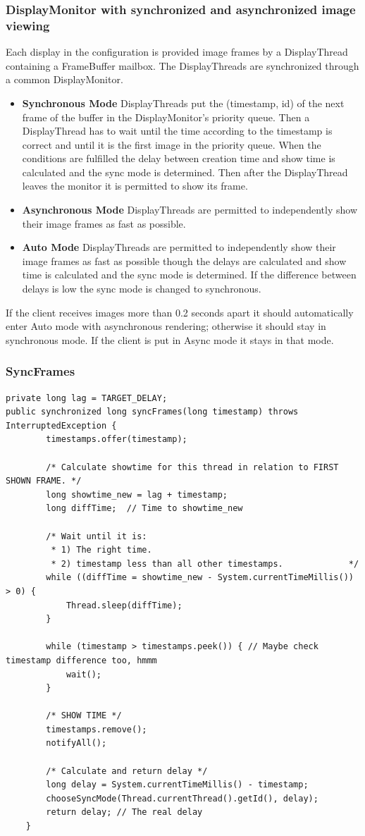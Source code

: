 \documentclass[8pt,titlepage]{article}
\begin{document}
\subsubsection{DisplayMonitor with synchronized and asynchronized image viewing}
Each display in the configuration is provided image frames by a DisplayThread containing a FrameBuffer mailbox. The DisplayThreads are synchronized through a common DisplayMonitor.

\begin{itemize}
\item \textbf{Synchronous Mode} DisplayThreads put the (timestamp, id) of the next frame of the buffer in the DisplayMonitor’s priority queue. Then a DisplayThread has to wait until the time according to the timestamp is correct and until it is the first image in the priority queue. When the conditions are fulfilled the delay between creation time and show time is calculated and the sync mode is determined. Then after the DisplayThread leaves the monitor it is permitted to show its frame. 	
\item \textbf{Asynchronous Mode} DisplayThreads are permitted to independently show their image frames as fast as possible.
\item \textbf{Auto Mode} DisplayThreads are permitted to independently show their image frames as fast as possible though the delays are calculated and show time is calculated and the sync mode is determined. If the difference between delays is low the sync mode is changed to synchronous.
\end{itemize}

If the client receives images more than 0.2 seconds apart it should automatically enter Auto mode with asynchronous rendering; otherwise it should stay in synchronous mode. If the client is put in Async mode it stays in that mode.

\subsubsection{SyncFrames}
\begin{verbatim}
private long lag = TARGET_DELAY;
public synchronized long syncFrames(long timestamp) throws InterruptedException {
		timestamps.offer(timestamp);

		/* Calculate showtime for this thread in relation to FIRST SHOWN FRAME. */
		long showtime_new = lag + timestamp;				
		long diffTime;	// Time to showtime_new

		/* Wait until it is:
		 * 1) The right time.
		 * 2) timestamp less than all other timestamps.				*/				
		while ((diffTime = showtime_new - System.currentTimeMillis()) > 0) {
			Thread.sleep(diffTime);		
		} 

		while (timestamp > timestamps.peek()) { // Maybe check timestamp difference too, hmmm
			wait();
		}

		/* SHOW TIME */
		timestamps.remove();
		notifyAll();

		/* Calculate and return delay */
		long delay = System.currentTimeMillis() - timestamp;					
		chooseSyncMode(Thread.currentThread().getId(), delay);
		return delay; // The real delay
	}
\end{verbatim}
\end{document}
